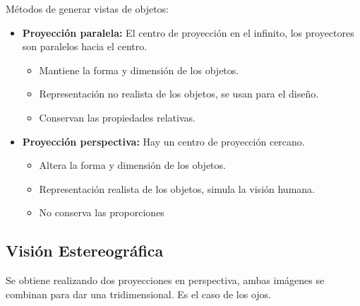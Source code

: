 Métodos de generar vistas de objetos:
\begin{itemize}
	\item \textbf{Proyección paralela:} El centro de proyección en el infinito, los proyectores son paralelos hacia el centro.
	      \begin{itemize}
		      \item Mantiene la forma y dimensión de los objetos.
		      \item Representación no realista de los objetos, se usan para el diseño.
		      \item Conservan las propiedades relativas.
	      \end{itemize}
	      \begin{figure}[H]
		      {\def\svgwidth{.5\textwidth}
			      }
	      \end{figure}
	\item \textbf{Proyección perspectiva:} Hay un centro de proyección cercano.
	      \begin{itemize}
		      \item Altera la forma y dimensión de los objetos.
		      \item Representación realista de los objetos, simula la visión humana.
		      \item No conserva las proporciones
	      \end{itemize}
	      \vspace{-5cm}
	      \begin{figure}[H]
		      {\def\svgwidth{.5\textwidth}
			      }
	      \end{figure}
\end{itemize}

\subsection{Visión Estereográfica}
Se obtiene realizando dos proyecciones en perspectiva, ambas imágenes se combinan para dar una tridimensional. Es el caso de los ojos.

